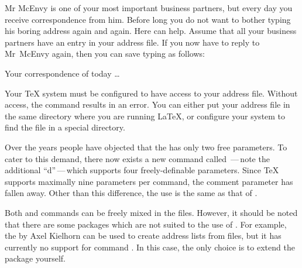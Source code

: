 \begin{Example}
  Mr McEnvy is one of your most important business partners, but
  every day you receive correspondence from him.  Before long you do
  not want to bother typing his boring address again and again.  Here
   can help.  Assume that all your business partners
  have an entry in your  address file.  If you now
  have to reply to Mr~McEnvy again, then you can save typing as
  follows:
  \begin{lstcode}
    
    \begin{letter}{\FLANN}
      Your correspondence of today \dots
    \end{letter}
  \end{lstcode}
  Your {\TeX} system must be configured to have access to your address
  file. Without access, the  command results in an
  error. You can either put your address file in the same directory
  where you are running {\LaTeX}, or configure your system to find the
  file in a special directory.
\end{Example}
% 

\begin{Declaration}
\end{Declaration}%
%
Over the years people have objected that the  has only two
free parameters. To cater to this demand, there now exists a new command
called \,---\,note the additional ``d''\,---\,which supports
four freely-definable parameters. Since {\TeX} supports maximally nine
parameters per command, the comment parameter has fallen away. Other than this
difference, the use is the same as that of .

Both  and  commands can be freely mixed in
the  files. However, it should be noted that there are some packages
which are not suited to the use of .  For example, the
 by Axel Kielhorn can be used to create address lists from
 files, but it has currently no support for command
.  In this case, the only choice is to extend the package
yourself.%
%

